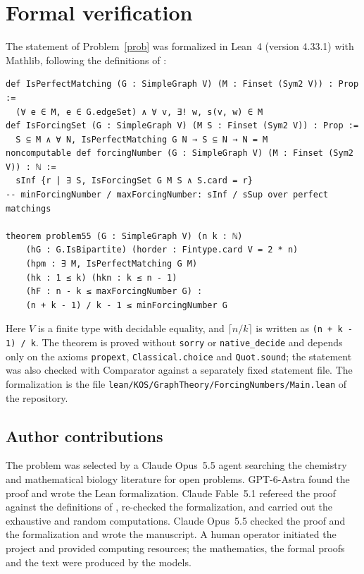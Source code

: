 \documentclass[11pt]{amsart}
\theoremstyle{remark}
\begin{document}
\section{Formal verification}

The statement of Problem~\ref{prob} was formalized in Lean~4 (version 4.33.1) with Mathlib, following the definitions of \cite{LDZ}:
\begin{Verbatim}[fontsize=\small,frame=single]
def IsPerfectMatching (G : SimpleGraph V) (M : Finset (Sym2 V)) : Prop :=
  (∀ e ∈ M, e ∈ G.edgeSet) ∧ ∀ v, ∃! w, s(v, w) ∈ M
def IsForcingSet (G : SimpleGraph V) (M S : Finset (Sym2 V)) : Prop :=
  S ⊆ M ∧ ∀ N, IsPerfectMatching G N → S ⊆ N → N = M
noncomputable def forcingNumber (G : SimpleGraph V) (M : Finset (Sym2 V)) : ℕ :=
  sInf {r | ∃ S, IsForcingSet G M S ∧ S.card = r}
-- minForcingNumber / maxForcingNumber: sInf / sSup over perfect matchings

theorem problem55 (G : SimpleGraph V) (n k : ℕ)
    (hG : G.IsBipartite) (horder : Fintype.card V = 2 * n)
    (hpm : ∃ M, IsPerfectMatching G M)
    (hk : 1 ≤ k) (hkn : k ≤ n - 1)
    (hF : n - k ≤ maxForcingNumber G) :
    (n + k - 1) / k - 1 ≤ minForcingNumber G
\end{Verbatim}
Here $V$ is a finite type with decidable equality, and $\lceil n/k\rceil$ is written as \texttt{(n + k - 1) / k}.
The theorem is proved without \texttt{sorry} or \texttt{native\_decide} and depends only on the axioms \texttt{propext}, \texttt{Classical.choice} and \texttt{Quot.sound}; the statement was also checked with Comparator against a separately fixed statement file.
The formalization is the file \nolinkurl{lean/KOS/GraphTheory/ForcingNumbers/Main.lean} of the repository.

\subsection*{Author contributions}
The problem was selected by a Claude Opus~5.5 agent searching the chemistry and mathematical biology literature for open problems.
GPT-6-Astra found the proof and wrote the Lean formalization.
Claude Fable~5.1 refereed the proof against the definitions of \cite{LDZ}, re-checked the formalization, and carried out the exhaustive and random computations.
Claude Opus~5.5 checked the proof and the formalization and wrote the manuscript.
A human operator initiated the project and provided computing resources; the mathematics, the formal proofs and the text were produced by the models.
\end{document}
